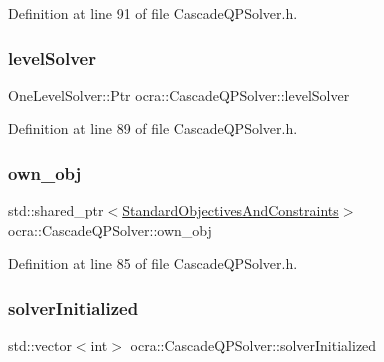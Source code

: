 Definition at line 91 of file Cascade\+Q\+P\+Solver.\+h.

\hypertarget{classocra_1_1CascadeQPSolver_a119ac44ca89426cddf6484577962726d}{}\label{classocra_1_1CascadeQPSolver_a119ac44ca89426cddf6484577962726d} 
\subsubsection{\texorpdfstring{level\+Solver}{levelSolver}}
{\footnotesize\ttfamily One\+Level\+Solver\+::\+Ptr ocra\+::\+Cascade\+Q\+P\+Solver\+::level\+Solver\hspace{0.3cm}{\ttfamily [protected]}}



Definition at line 89 of file Cascade\+Q\+P\+Solver.\+h.

\hypertarget{classocra_1_1CascadeQPSolver_aec6bf15caf1f29d7e1ec5aab696b1e7b}{}\label{classocra_1_1CascadeQPSolver_aec6bf15caf1f29d7e1ec5aab696b1e7b} 
\subsubsection{\texorpdfstring{own\+\_\+obj}{own\_obj}}
{\footnotesize\ttfamily std\+::shared\+\_\+ptr$<$\hyperlink{structocra_1_1CascadeQPSolver_1_1StandardObjectivesAndConstraints}{Standard\+Objectives\+And\+Constraints}$>$ ocra\+::\+Cascade\+Q\+P\+Solver\+::own\+\_\+obj\hspace{0.3cm}{\ttfamily [protected]}}



Definition at line 85 of file Cascade\+Q\+P\+Solver.\+h.

\hypertarget{classocra_1_1CascadeQPSolver_a9d45b623d0012aae018b8eb8d4a66646}{}\label{classocra_1_1CascadeQPSolver_a9d45b623d0012aae018b8eb8d4a66646} 
\subsubsection{\texorpdfstring{solver\+Initialized}{solverInitialized}}
{\footnotesize\ttfamily std\+::vector$<$int$>$ ocra\+::\+Cascade\+Q\+P\+Solver\+::solver\+Initialized\hspace{0.3cm}{\ttfamily [protected]}}



